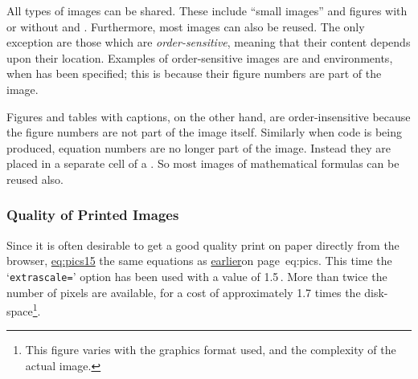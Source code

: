 %
%
%
%
%
%
%
\html{\\}%
%
All types of images can be shared.  These include ``small images''
and figures with or without 
and .
Furthermore, most images can also be reused.  The only
exception are those which are \emph{order-sensitive},
meaning that their content depends upon their location.
Examples of order-sensitive images are  
and  environments, 
when  has been specified;
this is because their figure numbers are part of the image.

%
\html{\\}%

Figures and tables with captions, on the other hand, 
are order-insensitive because the figure numbers 
are not part of the image itself.%
Similarly when \HTMLiii{} code is being produced, equation
numbers are no longer part of the image.
Instead they are placed in a separate cell of a .
So most images of mathematical formulas can be reused also.%


\subsubsection{Quality of Printed Images\label{printqual}}
%
\begin{htmlonly}
Since it is often desirable to get a good quality print on paper
directly from the browser, \hyperref{here are}{Figure~}{ shows}{eq:pics15} 
the same equations as \hyperref[page]{earlier}{on page~}{}{eq:pics}.
This time the `\texttt{extrascale=}' option has been used with a value of 1.5\,.
More than twice the number of pixels are available, 
for a cost of approximately 1.7 times the disk-space\footnote{This figure
varies with the graphics format used, and the complexity of the actual image.}.

\end{htmlonly}

